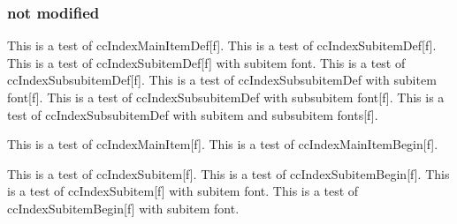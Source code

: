 \documentclass{article}
\begin{document}
{{{{\subsubsection{not modified}
This is a test of ccIndexMainItemDef[f].
This is a test of ccIndexSubitemDef[f].
This is a test of ccIndexSubitemDef[f] with subitem font.
This is a test of ccIndexSubsubitemDef[f].
This is a test of ccIndexSubsubitemDef with subitem font[f].
This is a test of ccIndexSubsubitemDef with subsubitem font[f].
This is a test of ccIndexSubsubitemDef with subitem and subsubitem fonts[f].

\pagebreak

This is a test of ccIndexMainItem[f].
This is a test of ccIndexMainItemBegin[f].

This is a test of ccIndexSubitem[f].
This is a test of ccIndexSubitemBegin[f].
This is a test of ccIndexSubitem[f] with subitem font.
This is a test of ccIndexSubitemBegin[f] with subitem font.

}}}}
\end{document}
